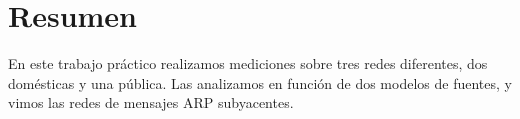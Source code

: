 \section{Resumen}

En este trabajo práctico realizamos mediciones sobre tres redes diferentes, dos domésticas y una pública. Las analizamos en función de dos modelos de fuentes, y vimos las redes de mensajes ARP subyacentes. 


